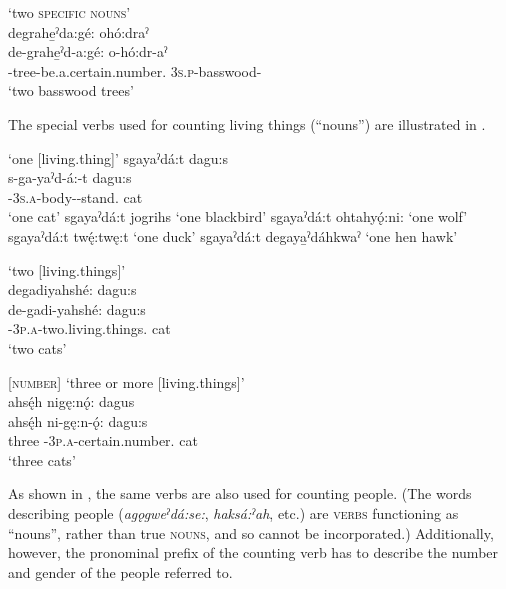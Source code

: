 \newpage
\ea\label{ex:countplaceholdex9}  ‘two \textsc{specific nouns}’\\
degrahe̱ˀda:gé: ohó:draˀ\\
\gll de-grahe̱ˀd-a:gé: o-hó:dr-aˀ\\
 {\dualic}-tree-be.a.certain.number.{\stative}  \textsc{3s.p}-basswood-{\nounstemformer}\\
\glt `two basswood trees'
\z


The special verbs used for counting living things (“nouns”) are illustrated in . 

\ea\label{ex:countplaceholdex3}   ‘one [living.thing]’
\ea sgayaˀdá:t dagu:s\\
\gll s-ga-yaˀd-á:-t dagu:s\\
 {\repetitive}-\textsc{3s.a}-body-{\joinerA}-stand.{\stative} cat\\
\glt `one cat'
\ex sgayaˀdá:t jogrihs ‘one blackbird’
\ex sgayaˀdá:t ohtahyǫ́:ni: ‘one wolf’
\ex sgayaˀdá:t twę́:twę:t ‘one duck’
\ex sgayaˀdá:t degaya̱ˀdáhkwaˀ ‘one hen hawk’
\z
\z

\ea\label{ex:countplaceholdex4}   ‘two [living.things]’\\
degadiyahshé: dagu:s\\
\gll de-gadi-yahshé: dagu:s\\
 {\dualic}-\textsc{3p.a}-two.living.things.{\stative} cat\\
\glt `two cats'
\z


\ea\label{ex:countplaceholdex5} [\textsc{number}]  ‘three or more [living.things]’\\
ahsę́h nigę:nǫ́: dagus \\
\gll ahsę́h ni-gę:n-ǫ́: dagu:s\\
three {\partitive}-\textsc{3p.a}-certain.number.{\stative} cat\\
\glt `three cats'
\z


As shown in , the same verbs are also used for counting people. (The words describing people (\textit{agǫgweˀdá:se:}, \textit{haksá:ˀah}, etc.) are \textsc{verbs} functioning as “nouns”, rather than true \textsc{nouns}, and so cannot be incorporated.) Additionally, however, the pronominal prefix of the counting verb has to describe the number and gender of the people referred to. 


